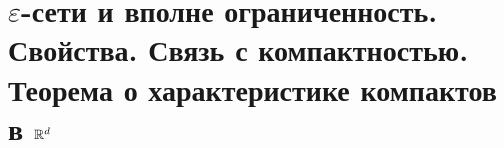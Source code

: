 \section{$\varepsilon$-сети и вполне ограниченность. Свойства. Связь с компактностью. Теорема о характеристике компактов в $\mathbb{R}^d$}